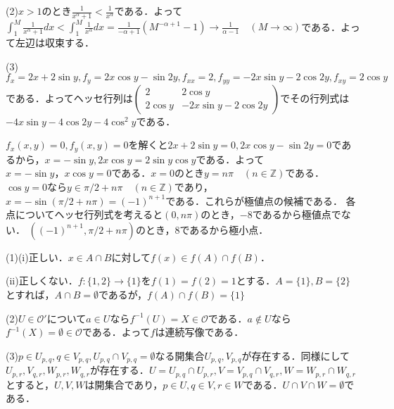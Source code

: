 \documentclass[
		book,
		head_space=20mm,
		foot_space=20mm,
		gutter=10mm,
		line_length=190mm
]{jlreq}
\begin{document}
(2)$x>1$のとき$\frac{1}{x^\alpha+1}<\frac{1}{x^\alpha}$である．よって$\int_1^M \frac{1}{x^\alpha+1}dx<\int_1^M \frac{1}{x^\alpha}dx=\frac{1}{-\alpha+1}(M^{-\alpha+1}-1)\rightarrow\frac{1}{\alpha-1}\quad(M \rightarrow \infty)$である．よって左辺は収束する．

(3)$f_x=2x+2\sin y,f_y=2x\cos y-\sin2y,f_{xx}=2,f_{yy}=-2x\sin y -2\cos 2y,f_{xy}=2\cos y$である．よってヘッセ行列は$\begin{pmatrix}
    2 & 2\cos y\\
    2\cos y & -2x\sin y -2\cos 2y
\end{pmatrix}$でその行列式は$-4x\sin y -4\cos 2y-4\cos^2 y$である．

$f_x(x,y)=0,f_y(x,y)=0$を解くと$2x+2\sin y=0,2x\cos y-\sin 2y=0$であるから，$x=-\sin y,2x\cos y=2\sin y \cos y$である．よって$x=-\sin y，x\cos y=0$である．$x=0$のとき$y=n\pi \quad(n \in \mathbb{Z})$である．$\cos y=0$なら$y \in \pi/2 + n\pi \quad(n \in \mathbb{Z})$であり，$x=-\sin (\pi/2+n\pi)=(-1)^{n+1}$である．これらが極値点の候補である．
各点についてヘッセ行列式を考えると$(0,n\pi)$のとき，$-8$であるから極値点でない．
$((-1)^{n+1},\pi/2+n\pi)$のとき，$8$であるから極小点．

(1)(i)正しい．$x \in A \cap B$に対して$f(x)\in f(A)\cap f(B)$．

(ii)正しくない．$f \colon \{ 1,2\} \rightarrow\{1\}$を$f(1)=f(2)=1$とする．$A=\{ 1\},B=\{ 2\}$とすれば，$A \cap B = \emptyset$であるが，$f(A)\cap f(B)=\{1\}$

(2)$U \in \mathcal{O}'$について$a \in U$なら$f^{-1}(U)=X \in \mathcal{O}$である．$  a\notin U$なら$f^{-1}(X)=\emptyset \in \mathcal{O}$である．よって$f$は連続写像である．

(3)$p \in U_{p,q},q\in V_{p,q},U_{p,q} \cap V_{p,q}=\emptyset$なる開集合$U_{p,q},V_{p,q}$が存在する．同様にして$U_{p,r},V_{q,r},W_{p,r},W_{q,r}$が存在する．$U=U_{p,q}\cap U_{p,r},V=V_{p,q}\cap V_{q,r},W=W_{p,r}\cap W_{q,r}$とすると，$U,V,W$は開集合であり，$p \in U,q \in V,r \in W$である．$U \cap V \cap W=\emptyset$である．
\end{document}
